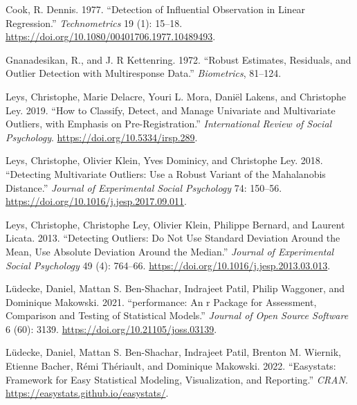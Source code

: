 \documentclass{article}
\newlength{\cslhangindent}
\newlength{\cslentryspacingunit} %
\newenvironment{CSLReferences}[2] %
 {%
  \setlength{\parindent}{0pt}
  \ifodd #1
  \let\oldpar\par
  \def\par{\hangindent=\cslhangindent\oldpar}
  \fi
  \setlength{\parskip}{#2\cslentryspacingunit}
 }%
 {}
\begin{document}
\hypertarget{refs}{}
\begin{CSLReferences}{1}{0}
\leavevmode{}%
Cook, R. Dennis. 1977. {``Detection of Influential Observation in Linear
Regression.''} \emph{Technometrics} 19 (1): 15--18.
\url{https://doi.org/10.1080/00401706.1977.10489493}.

\leavevmode{}%
Gnanadesikan, R., and J. R Kettenring. 1972. {``Robust Estimates,
Residuals, and Outlier Detection with Multiresponse Data.''}
\emph{Biometrics}, 81--124.

\leavevmode{}%
Leys, Christophe, Marie Delacre, Youri L. Mora, Daniël Lakens, and
Christophe Ley. 2019. {``How to Classify, Detect, and Manage Univariate
and Multivariate Outliers, with Emphasis on Pre-Registration.''}
\emph{International Review of Social Psychology}.
\url{https://doi.org/10.5334/irsp.289}.

\leavevmode{}%
Leys, Christophe, Olivier Klein, Yves Dominicy, and Christophe Ley.
2018. {``Detecting Multivariate Outliers: Use a Robust Variant of the
Mahalanobis Distance.''} \emph{Journal of Experimental Social
Psychology} 74: 150--56.
\url{https://doi.org/10.1016/j.jesp.2017.09.011}.

\leavevmode{}%
Leys, Christophe, Christophe Ley, Olivier Klein, Philippe Bernard, and
Laurent Licata. 2013. {``Detecting Outliers: Do Not Use Standard
Deviation Around the Mean, Use Absolute Deviation Around the Median.''}
\emph{Journal of Experimental Social Psychology} 49 (4): 764--66.
\url{https://doi.org/10.1016/j.jesp.2013.03.013}.

\leavevmode{}%
Lüdecke, Daniel, Mattan S. Ben-Shachar, Indrajeet Patil, Philip
Waggoner, and Dominique Makowski. 2021. {``{performance}: An r Package
for Assessment, Comparison and Testing of Statistical Models.''}
\emph{Journal of Open Source Software} 6 (60): 3139.
\url{https://doi.org/10.21105/joss.03139}.

\leavevmode{}%
Lüdecke, Daniel, Mattan S. Ben-Shachar, Indrajeet Patil, Brenton M.
Wiernik, Etienne Bacher, Rémi Thériault, and Dominique Makowski. 2022.
{``Easystats: Framework for Easy Statistical Modeling, Visualization,
and Reporting.''} \emph{CRAN}.
\url{https://easystats.github.io/easystats/}.


\end{CSLReferences}
\end{document}
